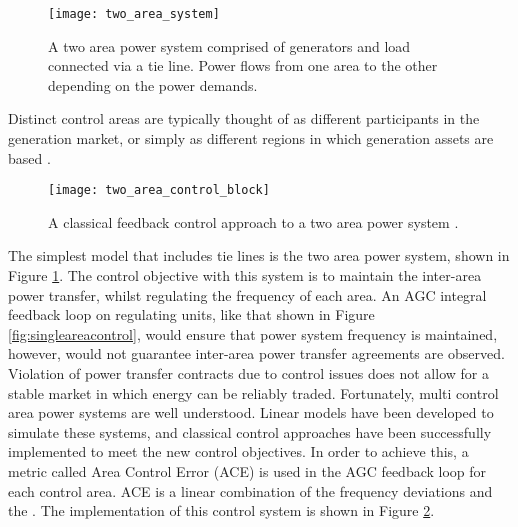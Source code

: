 \begin{figure}[ht]
	\centering
	\texttt{[image: two\_area\_system]}
	\caption{A two area power system comprised of generators and load connected via a tie line. Power flows from one area to the other depending on the power demands.}
	\label{fig:twoareapower}
\end{figure}

Distinct control areas are typically thought of as different participants in the generation market, or simply as different regions in which generation assets are based \cite{Kothari2011}.

\begin{figure}[ht]
	\centering
	\texttt{[image: two\_area\_control\_block]}
	\caption{A classical feedback control approach to a two area power system \cite{Kundur1994}.}
	\label{fig:twoareacontrolblock}
\end{figure}

The simplest model that includes tie lines is the two area power system, shown in Figure \ref{fig:twoareapower}. The control objective with this system is to maintain the inter-area power transfer, whilst regulating the frequency of each area. An AGC integral feedback loop on regulating units, like that shown in Figure \ref{fig:singleareacontrol}, would ensure that power system frequency is maintained, however, would not guarantee inter-area power transfer agreements are observed. Violation of power transfer contracts due to control issues does not allow for a stable market in which energy can be reliably traded. Fortunately, multi control area power systems are well understood. Linear models have been developed to simulate these systems, and classical control approaches have been successfully implemented to meet the new control objectives. In order to achieve this, a metric called Area Control Error (ACE) is used in the AGC feedback loop for each control area. ACE is a linear combination of the frequency deviations and the . The implementation of this control system is shown in Figure \ref{fig:twoareacontrolblock}.